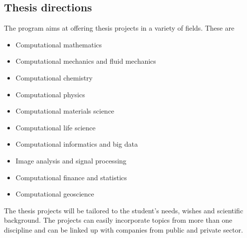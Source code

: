 \documentclass[%
oneside,                 %
final,                   %
10pt]{article}
\begin{document}
\subsection{Thesis directions}
\begin{block}{}
The program aims at offering thesis projects in a variety of fields. These are

\begin{itemize}
\item Computational mathematics

\item Computational mechanics and fluid mechanics 

\item Computational chemistry

\item Computational physics

\item Computational materials science

\item Computational life science

\item Computational informatics and big data

\item Image analysis and signal processing

\item Computational finance and statistics 

\item Computational geoscience
\end{itemize}

\noindent
The thesis projects will be tailored to the student's needs, wishes and scientific background. The projects can easily incorporate topics from more than one discipline and can be linked up with companies from public and private sector.
\end{block}

\end{document}
